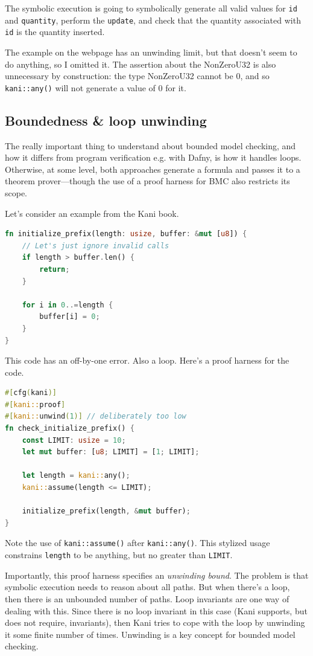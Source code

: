 \documentclass[11pt]{article}
\begin{document}
The symbolic execution is going to symbolically generate all valid
values for \texttt{id} and \texttt{quantity}, perform the \texttt{update}, and check that the
quantity associated with \texttt{id} is the quantity inserted.

The example on the webpage has an unwinding limit, but that doesn't seem to do anything, so I omitted it.
The assertion about the NonZeroU32 is also unnecessary by construction: the type NonZeroU32 cannot be 0,
and so \texttt{kani::any()} will not generate a value of 0 for it.

\subsection*{Boundedness \& loop unwinding}
The really important thing to understand about bounded model checking,
and how it differs from program verification e.g. with Dafny, is how
it handles loops. Otherwise, at some level, both approaches generate a
formula and passes it to a theorem prover---though the use of a proof
harness for BMC also restricts its scope.

Let's consider an example from the Kani book.
\begin{lstlisting}[language=Rust]
fn initialize_prefix(length: usize, buffer: &mut [u8]) {
    // Let's just ignore invalid calls
    if length > buffer.len() {
        return;
    }

    for i in 0..=length {
        buffer[i] = 0;
    }
}
\end{lstlisting}
This code has an off-by-one error. Also a loop. Here's a proof harness
for the code.

\begin{lstlisting}[language=Rust]
#[cfg(kani)]
#[kani::proof]
#[kani::unwind(1)] // deliberately too low
fn check_initialize_prefix() {
    const LIMIT: usize = 10;
    let mut buffer: [u8; LIMIT] = [1; LIMIT];

    let length = kani::any();
    kani::assume(length <= LIMIT);

    initialize_prefix(length, &mut buffer);
}
\end{lstlisting}
Note the use of \texttt{kani::assume()} after \texttt{kani::any()}. This stylized
usage constrains \texttt{length} to be anything, but no greater than \texttt{LIMIT}.

Importantly, this proof harness specifies an \emph{unwinding bound}.
The problem is that symbolic execution needs to reason about all paths.
But when there's a loop, then there is an unbounded number of paths.
Loop invariants are one way of dealing with this.
Since there is no loop
invariant in this case (Kani supports, but does not require, invariants), then Kani tries to cope
with the loop by unwinding it some finite number of times. Unwinding is a key concept
for bounded model checking.
\end{document}
